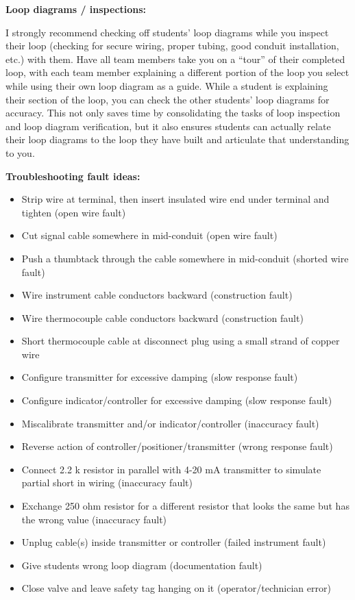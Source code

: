 \noindent
{\bf Loop diagrams / inspections:}

I strongly recommend checking off students' loop diagrams while you inspect their loop (checking for secure wiring, proper tubing, good conduit installation, etc.) with them.  Have all team members take you on a ``tour'' of their completed loop, with each team member explaining a different portion of the loop you select while using their own loop diagram as a guide.  While a student is explaining their section of the loop, you can check the other students' loop diagrams for accuracy.  This not only saves time by consolidating the tasks of loop inspection and loop diagram verification, but it also ensures students can actually relate their loop diagrams to the loop they have built and articulate that understanding to you.

\vskip 10pt

\goodbreak

\noindent
{\bf Troubleshooting fault ideas:}

\begin{itemize}
\item{} Strip wire at terminal, then insert insulated wire end under terminal and tighten (open wire fault)
\item{} Cut signal cable somewhere in mid-conduit (open wire fault)
\item{} Push a thumbtack through the cable somewhere in mid-conduit (shorted wire fault)
\item{} Wire instrument cable conductors backward (construction fault)
\item{} Wire thermocouple cable conductors backward (construction fault)
\item{} Short thermocouple cable at disconnect plug using a small strand of copper wire
\item{} Configure transmitter for excessive damping (slow response fault)
\item{} Configure indicator/controller for excessive damping (slow response fault)
\item{} Miscalibrate transmitter and/or indicator/controller (inaccuracy fault)
\item{} Reverse action of controller/positioner/transmitter (wrong response fault)
\item{} Connect 2.2 k resistor in parallel with 4-20 mA transmitter to simulate partial short in wiring (inaccuracy fault)
\item{} Exchange 250 ohm resistor for a different resistor that looks the same but has the wrong value (inaccuracy fault) 
\item{} Unplug cable(s) inside transmitter or controller (failed instrument fault)
\item{} Give students wrong loop diagram (documentation fault)
\item{} Close valve and leave safety tag hanging on it (operator/technician error)
\end{itemize}









